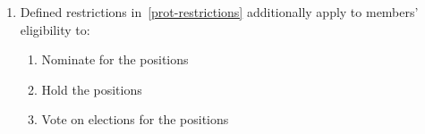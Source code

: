 \documentclass[a4paper,11pt,parskip=half-]{scrartcl} %
\begin{document}
\begin{enumerate}
\begin{enumerate}
                    \item\label{pg-rep-restriction}  positions are recognised as protected positions, restricted to only Postgraduate members. Voting for  positions shall be exempt from .
            \end{enumerate}

        \item Defined restrictions in~\ref{prot-restrictions} additionally apply to members' eligibility to:
            \begin{enumerate}
                \item Nominate for the positions
                \item Hold the positions
                \item Vote on elections for the positions
            \end{enumerate}
    \end{enumerate}
\end{document}
